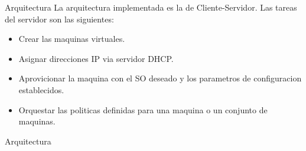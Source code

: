 \begin{frame}{Arquitectura}
    \vspace{-1.5cm}
    La arquitectura implementada es la de Cliente-Servidor.
    Las tareas del servidor son las siguientes:
    \begin{itemize}
        \item Crear las maquinas virtuales.
        \item Asignar direcciones IP via servidor DHCP.
        \item Aprovicionar la maquina con el SO deseado y los parametros de configuracion establecidos.
        \item Orquestar las politicas definidas para una maquina o un conjunto de maquinas.
    \end{itemize}

\end{frame}

\begin{frame}{Arquitectura}
    \vspace{-1.5cm}
    \begin{figure}[ht]
       \centering
       \vspace{-0.50cm}
    \end{figure}

\end{frame}


